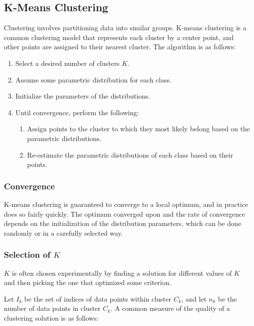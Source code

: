 \documentclass[12pt,titlepage]{article}
\begin{document}
    \subsection{K-Means Clustering}
      Clustering involves partitioning data into similar groups. K-means clustering is a common clustering model that represents each cluster by a center
      point, and other points are assigned to their nearest cluster. The algorithm is as follows:

      \begin{enumerate}
        \item Select a desired number of clusters $K$.
        \item Assume some parametric distribution for each class.
        \item Initialize the parameters of the distributions.
        \item Until convergence, perform the following:
          \begin{enumerate}
            \item Assign points to the cluster to which they most likely belong based on the parametric distributions.
            \item Re-estimate the parametric distributions of each class based on their points.
          \end{enumerate}
      \end{enumerate}

      \subsubsection{Convergence}
        K-means clustering is guaranteed to converge to a local optimum, and in practice does so fairly quickly. The optimum converged upon and the rate
        of convergence depends on the initialization of the distribution parameters, which can be done randomly or in a carefully selected way.

      \subsubsection{Selection of $K$}
        $K$ is often chosen experimentally by finding a solution for different values of $K$ and then picking the one that optimized some criterion.

        Let $I_k$ be the set of indices of data points within cluster $C_k$, and let $n_k$ be the number of data points in cluster $C_k$. A common
        measure of the quality of a clustering solution is as follows:
\end{document}
